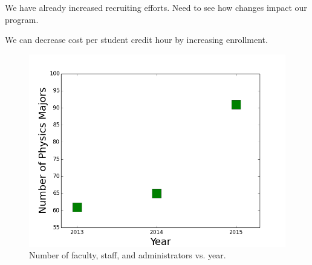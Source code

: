 \documentclass[12pt]{article}
\begin{document}
We have already increased recruiting efforts.  Need to see how changes impact our program.

We can decrease cost per
student credit hour by increasing enrollment.  



\begin{figure}[h]
\includegraphics[width=.85\textwidth]{Nmajors_year.png}
\caption{Number of faculty, staff, and administrators vs. year.}
\label{nmajors}
\end{figure}
\end{document}

